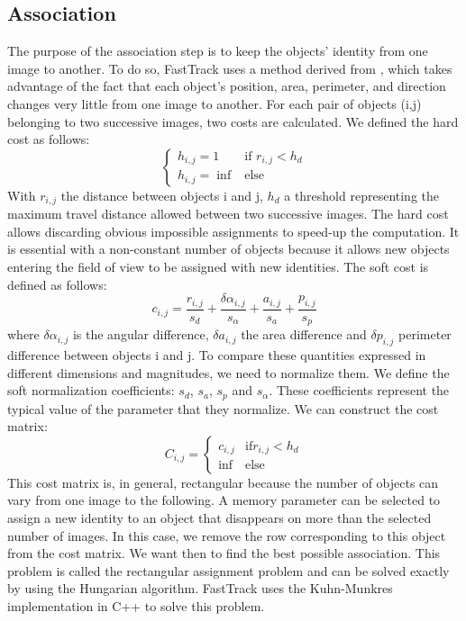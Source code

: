 		\subsection{Association}
		The purpose of the association step is to keep the objects' identity from one image to another. To do so, FastTrack uses a method derived from \cite{}, which takes advantage of the fact that each object's position, area, perimeter, and direction changes very little from one image to another.
		For each pair of objects (i,j) belonging to two successive images, two costs are calculated.
		We defined the hard cost as follows:
        $$
        \left\{
        	\begin{array}{ll}
        		h_{i,j} = 1 & \mbox{if } r_{i,j} < h_{d} \\
        		h_{i,j} = \inf & \mbox{else }
        	\end{array}
        \right.
        $$
        With $r_{i,j}$ the distance between objects i and j, $h_{d}$ a threshold representing the maximum travel distance allowed between two successive images. The hard cost allows discarding obvious impossible assignments to speed-up the computation. It is essential with a non-constant number of objects because it allows new objects entering the field of view to be assigned with new identities.
		The soft cost is defined as follows:
		$$
        c_{i,j} = \frac{r_{i,j}}{s_d} + \frac{\delta\alpha_{i,j}}{s_{\alpha}} + \frac{a_{i,j}}{s_a} + \frac{p_{i,j}}{s_p}
		$$
		where $\delta\alpha_{i,j}$ is the angular difference, $\delta a_{i,j}$ the area difference and $\delta p_{i,j}$ perimeter difference between objects i and j. To compare these quantities expressed in different dimensions and magnitudes, we need to normalize them. We define the soft normalization coefficients: $s_{d}$, $s_{a}$, $s_{p}$ and $s_{\alpha}$. These coefficients represent the typical value of the parameter that they normalize.
        We can construct the cost matrix:
		$$
        C_{i,j} = \left\{
        	\begin{array}{ll}
        		c_{i,j} & \mbox{if} r_{i,j} < h_{d} \\
        		\inf & \mbox{else}
        	\end{array}
        \right.
        $$
        This cost matrix is, in general, rectangular because the number of objects can vary from one image to the following. A memory parameter can be selected to assign a new identity to an object that disappears on more than the selected number of images. In this case, we remove the row corresponding to this object from the cost matrix.
        We want then to find the best possible association. This problem is called the rectangular assignment problem and can be solved exactly by using the Hungarian algorithm. FastTrack uses the Kuhn-Munkres implementation in C++ to solve this problem.

